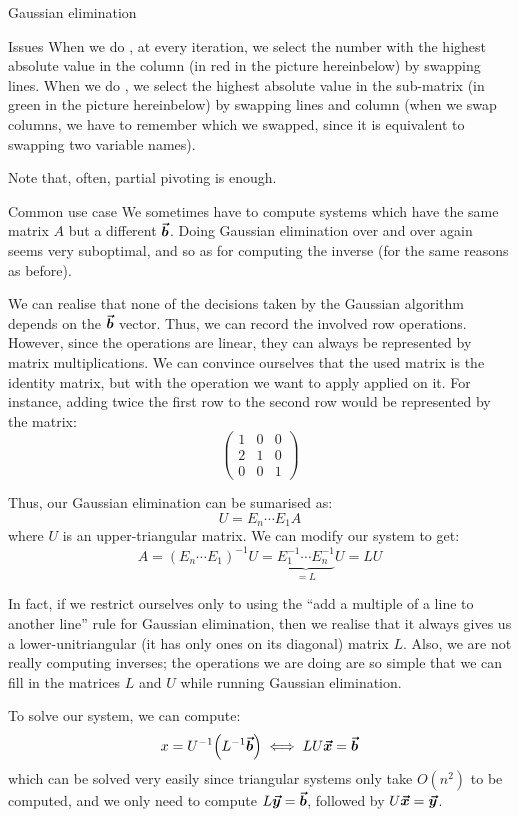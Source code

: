 \documentclass[a4paper]{article}
\begin{document}
\begin{parag}{Gaussian elimination}
\begin{subparag}{Issues}
        When we do , at every iteration, we select the number with the highest absolute value in the column (in red in the picture hereinbelow) by swapping lines. When we do , we select the highest absolute value in the sub-matrix (in green in the picture hereinbelow) by swapping lines and column (when we swap columns, we have to remember which we swapped, since it is equivalent to swapping two variable names).

        Note that, often, partial pivoting is enough.
    \end{subparag}
    
\end{parag}

\begin{parag}{Common use case}
    We sometimes have to compute systems which have the same matrix $A$ but a different $\bm{\protect\vec{b}}$. Doing Gaussian elimination over and over again seems very suboptimal, and so as for computing the inverse (for the same reasons as before).

    We can realise that none of the decisions taken by the Gaussian algorithm depends on the $\bm{\protect\vec{b}}$ vector. Thus, we can record the involved row operations. However, since the operations are linear, they can always be represented by matrix multiplications. We can convince ourselves that the used matrix is the identity matrix, but with the operation we want to apply applied on it. For instance, adding twice the first row to the second row would be represented by the matrix:
    \[\begin{pmatrix} 1 & 0 & 0 \\ 2 & 1 & 0 \\ 0 & 0 & 1 \end{pmatrix} \]
    
    Thus, our Gaussian elimination can be sumarised as: 
    \[U = E_n \cdots E_1 A\]
    where $U$ is an upper-triangular matrix. We can modify our system to get: 
    \[A = \left(E_n \cdots E_1\right)^{-1} U = \underbrace{E_1^{-1} \cdots E_n^{-1}}_{= L} U = LU\]

    In fact, if we restrict ourselves only to using the ``add a multiple of a line to another line'' rule for Gaussian elimination, then we realise that it always gives us a lower-unitriangular (it has only ones on its diagonal) matrix $L$. Also, we are not really computing inverses; the operations we are doing are so simple that we can fill in the matrices $L$ and $U$ while running Gaussian elimination.

    To solve our system, we can compute: 
    \[x = U^{-1} \left(L^{-1} \bvec{b}\right) \iff L U \bvec{x} = \bvec{b}\]
    which can be solved very easily since triangular systems only take $O\left(n^2\right)$ to be computed, and we only need to compute $L \bm{\protect\vec{y}} = \bm{\protect\vec{b}}$, followed by $U \bm{\protect\vec{x}} = \bm{\protect\vec{y}}$.
\end{parag}
\end{document}

